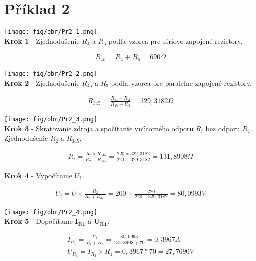 \section{Příklad 2}

\begin{center}
\texttt{[image: fig/obr/Pr2\_1.png]} \\
\textbf{Krok 1} - Zjednodušenie $R_{4}$ a $R_{5}$ podľa vzorca pre sériovo zapojené rezistory.
\end{center}

\begin{gather*}
R_{45}=R_{4} + R_{5}=690\Omega 
\end{gather*}


\begin{center}
\texttt{[image: fig/obr/Pr2\_2.png]} \\
\textbf{Krok 2} - Zjednodušenie $R_{45}$ a $R_{3}$ podľa vzorca pre paralelne zapojené rezistory.
\end{center}

\begin{gather*}
R_{345}=\frac{R_{45} \times R_{3}}{R_{45}+R_{3}}=329,3182\Omega 
\end{gather*}


\begin{center}
\texttt{[image: fig/obr/Pr2\_3.png]} \\
\textbf{Krok 3} - Skratovanie zdroja a spočítanie vnútorného odporu $R_{i}$ bez odporu $R_{1}$. Zjednodušenie $R_{2}$ a $R_{345}$.
\end{center}

\begin{gather*}
R_{i}=\frac{R_{2} \times R_{345}}{R_{2}+R_{345}}=\frac{220 \times 329,3182}{220+329,3182}=131,8908\Omega 
\end{gather*}

\newpage

\begin{center}
\textbf{Krok 4} - Vypočítame $U_{i}$.
\end{center}

\begin{gather*}
U_{i}=U \times \frac{R_{2}}{R_{2}+R_{345}}=200 \times \frac{220}{220+329,3182}=80,0993V 
\end{gather*}

\begin{center}
\texttt{[image: fig/obr/Pr2\_4.png]} \\
\textbf{Krok 5} - Dopočítame  $\boldsymbol{I_{R1}}$ a  $\boldsymbol{U_{R1}}$:
\end{center}

\begin{gather*}
I_{R_{1}}=\frac{U_{i}}{R_{i}+R_{1}}=\frac{80,0993}{131,8908+70}=0,3967A \\
U_{R_{1}}=I_{R_{1}} \times R_{1}=0,3967*70=27,7690V\\
\end{gather*}
